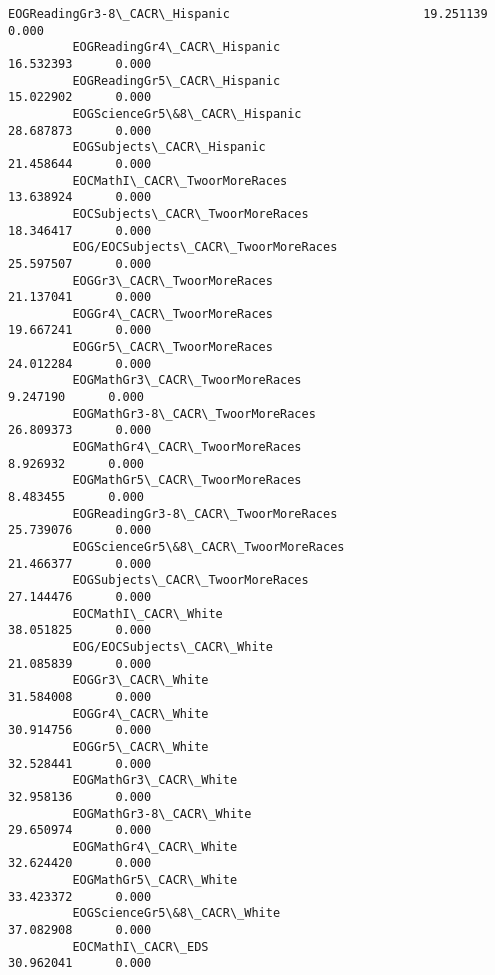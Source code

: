 \documentclass[11pt]{article}
\begin{document}
\begin{Verbatim}[commandchars=\\\{\}]
         EOGReadingGr3-8\_CACR\_Hispanic                           19.251139      0.000   
         EOGReadingGr4\_CACR\_Hispanic                             16.532393      0.000   
         EOGReadingGr5\_CACR\_Hispanic                             15.022902      0.000   
         EOGScienceGr5\&8\_CACR\_Hispanic                           28.687873      0.000   
         EOGSubjects\_CACR\_Hispanic                               21.458644      0.000   
         EOCMathI\_CACR\_TwoorMoreRaces                            13.638924      0.000   
         EOCSubjects\_CACR\_TwoorMoreRaces                         18.346417      0.000   
         EOG/EOCSubjects\_CACR\_TwoorMoreRaces                     25.597507      0.000   
         EOGGr3\_CACR\_TwoorMoreRaces                              21.137041      0.000   
         EOGGr4\_CACR\_TwoorMoreRaces                              19.667241      0.000   
         EOGGr5\_CACR\_TwoorMoreRaces                              24.012284      0.000   
         EOGMathGr3\_CACR\_TwoorMoreRaces                           9.247190      0.000   
         EOGMathGr3-8\_CACR\_TwoorMoreRaces                        26.809373      0.000   
         EOGMathGr4\_CACR\_TwoorMoreRaces                           8.926932      0.000   
         EOGMathGr5\_CACR\_TwoorMoreRaces                           8.483455      0.000   
         EOGReadingGr3-8\_CACR\_TwoorMoreRaces                     25.739076      0.000   
         EOGScienceGr5\&8\_CACR\_TwoorMoreRaces                     21.466377      0.000   
         EOGSubjects\_CACR\_TwoorMoreRaces                         27.144476      0.000   
         EOCMathI\_CACR\_White                                     38.051825      0.000   
         EOG/EOCSubjects\_CACR\_White                              21.085839      0.000   
         EOGGr3\_CACR\_White                                       31.584008      0.000   
         EOGGr4\_CACR\_White                                       30.914756      0.000   
         EOGGr5\_CACR\_White                                       32.528441      0.000   
         EOGMathGr3\_CACR\_White                                   32.958136      0.000   
         EOGMathGr3-8\_CACR\_White                                 29.650974      0.000   
         EOGMathGr4\_CACR\_White                                   32.624420      0.000   
         EOGMathGr5\_CACR\_White                                   33.423372      0.000   
         EOGScienceGr5\&8\_CACR\_White                              37.082908      0.000   
         EOCMathI\_CACR\_EDS                                       30.962041      0.000   

\end{Verbatim}
\end{document}
